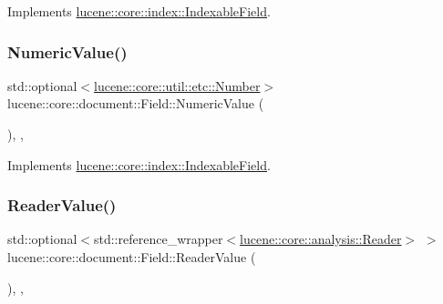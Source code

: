Implements \mbox{\hyperlink{classlucene_1_1core_1_1index_1_1IndexableField_a3eddf99b22a00458195e80429fa5ca82}{lucene\+::core\+::index\+::\+Indexable\+Field}}.

\mbox{\label{classlucene_1_1core_1_1document_1_1Field_af119306e6d6bf072d815f0f317dd287e}} 
\subsubsection{\texorpdfstring{Numeric\+Value()}{NumericValue()}}
{\footnotesize\ttfamily std\+::optional$<$\mbox{\hyperlink{classlucene_1_1core_1_1util_1_1etc_1_1Number}{lucene\+::core\+::util\+::etc\+::\+Number}}$>$ lucene\+::core\+::document\+::\+Field\+::\+Numeric\+Value (\begin{DoxyParamCaption}{ }\end{DoxyParamCaption})\hspace{0.3cm}{\ttfamily [inline]}, {\ttfamily [virtual]}, {\ttfamily [noexcept]}}



Implements \mbox{\hyperlink{classlucene_1_1core_1_1index_1_1IndexableField_ad57489328069fd1e227a0b1489159b85}{lucene\+::core\+::index\+::\+Indexable\+Field}}.

\mbox{\label{classlucene_1_1core_1_1document_1_1Field_a00a928f1bbae6e9d0e6fe1b3af302160}} 
\subsubsection{\texorpdfstring{Reader\+Value()}{ReaderValue()}}
{\footnotesize\ttfamily std\+::optional$<$std\+::reference\+\_\+wrapper$<$\mbox{\hyperlink{classlucene_1_1core_1_1analysis_1_1Reader}{lucene\+::core\+::analysis\+::\+Reader}}$>$ $>$ lucene\+::core\+::document\+::\+Field\+::\+Reader\+Value (\begin{DoxyParamCaption}{ }\end{DoxyParamCaption})\hspace{0.3cm}{\ttfamily [inline]}, {\ttfamily [virtual]}, {\ttfamily [noexcept]}}



